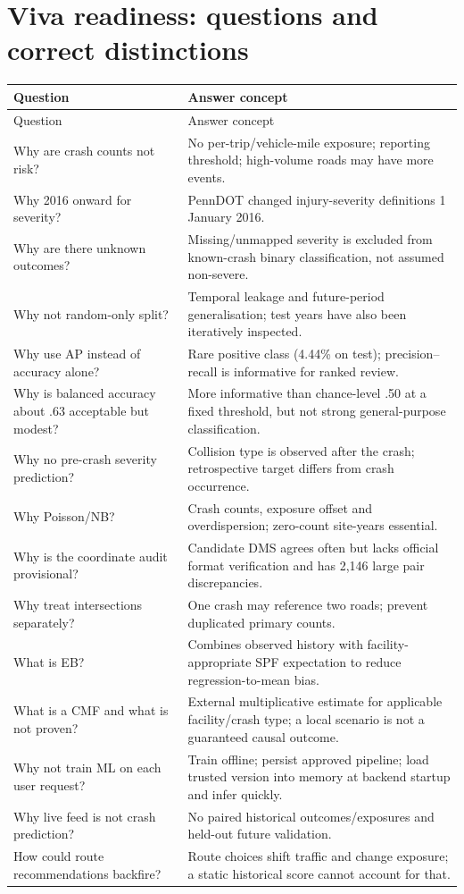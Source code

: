 \documentclass[11pt,a4paper,openany]{report}
\begin{document}
\section{Viva readiness: questions and correct distinctions}
\small
\begin{longtable}{@{}L{67mm}L{80mm}@{}}\toprule Question & Answer concept\\\midrule\endfirsthead
\toprule Question & Answer concept\\\midrule\endhead
Why are crash counts not risk? & No per-trip/vehicle-mile exposure; reporting threshold; high-volume roads may have more events.\\
Why 2016 onward for severity? & PennDOT changed injury-severity definitions 1 January 2016.\\
Why are there unknown outcomes? & Missing/unmapped severity is excluded from known-crash binary classification, not assumed non-severe.\\
Why not random-only split? & Temporal leakage and future-period generalisation; test years have also been iteratively inspected.\\
Why use AP instead of accuracy alone? & Rare positive class (4.44\% on test); precision--recall is informative for ranked review.\\
Why is balanced accuracy about .63 acceptable but modest? & More informative than chance-level .50 at a fixed threshold, but not strong general-purpose classification.\\
Why no pre-crash severity prediction? & Collision type is observed after the crash; retrospective target differs from crash occurrence.\\
Why Poisson/NB? & Crash counts, exposure offset and overdispersion; zero-count site-years essential.\\
Why is the coordinate audit provisional? & Candidate DMS agrees often but lacks official format verification and has 2,146 large pair discrepancies.\\
Why treat intersections separately? & One crash may reference two roads; prevent duplicated primary counts.\\
What is EB? & Combines observed history with facility-appropriate SPF expectation to reduce regression-to-mean bias.\\
What is a CMF and what is not proven? & External multiplicative estimate for applicable facility/crash type; a local scenario is not a guaranteed causal outcome.\\
Why not train ML on each user request? & Train offline; persist approved pipeline; load trusted version into memory at backend startup and infer quickly.\\
Why live feed is not crash prediction? & No paired historical outcomes/exposures and held-out future validation.\\
How could route recommendations backfire? & Route choices shift traffic and change exposure; a static historical score cannot account for that.\\
\bottomrule\end{longtable}
\normalsize
\end{document}
